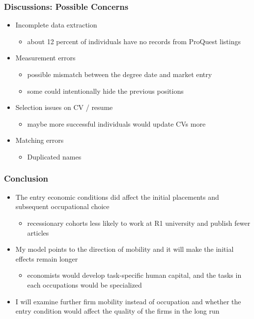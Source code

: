 \documentclass[11pt]{beamer}
\begin{document}
\begin{frame}
\frametitle{Discussions: Possible Concerns}
	\begin{itemize}
		\item Incomplete data extraction
		\begin{itemize}
			\item about 12 percent of individuals have no records from ProQuest listings 
		\end{itemize}
		\vspace{1 mm}
		\item Measurement errors
		\begin{itemize}
			\item possible mismatch between the degree date and market entry
			\item  some could intentionally hide the previous positions
		\end{itemize}

		\vspace{1 mm}
		\item Selection issues on CV / resume
		\begin{itemize}
			\item maybe more successful individuals would update CVs more    
		\end{itemize}
		\item Matching errors
		\vspace{1 mm}
		\begin{itemize}
			\item Duplicated names
		\end{itemize}
	\end{itemize}
\end{frame}



\begin{frame}
	\frametitle{Conclusion}
	\begin{itemize}
		\item The entry economic conditions did affect the initial placements and subsequent occupational choice
		\begin{itemize}
			\item recessionary cohorts less likely to work at R1 university and publish fewer articles
		\end{itemize}
	\item My model points to the direction of mobility and it will make the initial effects remain longer
	\begin{itemize}
		\item economists would develop task-specific human capital, and the tasks in each occupations would be specialized
	\end{itemize}
		\item I will examine further firm mobility instead of occupation and whether the entry condition would affect the quality of the firms in the long run
	\end{itemize}
\end{frame}
\end{document}
